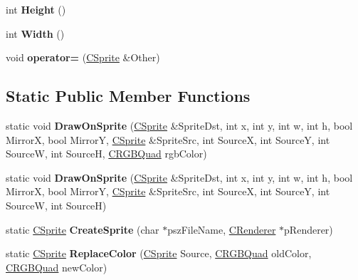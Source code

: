 \begin{DoxyCompactItemize}
\item 
int {\bfseries Height} ()\hypertarget{class_c_sprite_a90ef6f07dd9cace5c8ad5e9581aba2ac}{}\label{class_c_sprite_a90ef6f07dd9cace5c8ad5e9581aba2ac}

\item 
int {\bfseries Width} ()\hypertarget{class_c_sprite_ac1ccfd1392a07e66673de1e2c35104a0}{}\label{class_c_sprite_ac1ccfd1392a07e66673de1e2c35104a0}

\item 
void {\bfseries operator=} (\hyperlink{class_c_sprite}{C\+Sprite} \&Other)\hypertarget{class_c_sprite_a21407e6a129b42655692559fb197ec94}{}\label{class_c_sprite_a21407e6a129b42655692559fb197ec94}

\end{DoxyCompactItemize}
\subsection*{Static Public Member Functions}
\begin{DoxyCompactItemize}
\item 
static void {\bfseries Draw\+On\+Sprite} (\hyperlink{class_c_sprite}{C\+Sprite} \&Sprite\+Dst, int x, int y, int w, int h, bool MirrorX, bool MirrorY, \hyperlink{class_c_sprite}{C\+Sprite} \&Sprite\+Src, int SourceX, int SourceY, int SourceW, int SourceH, \hyperlink{struct_c_r_g_b_quad}{C\+R\+G\+B\+Quad} rgb\+Color)\hypertarget{class_c_sprite_a93dc7c6ee5c8910e34d99bd44c1454c7}{}\label{class_c_sprite_a93dc7c6ee5c8910e34d99bd44c1454c7}

\item 
static void {\bfseries Draw\+On\+Sprite} (\hyperlink{class_c_sprite}{C\+Sprite} \&Sprite\+Dst, int x, int y, int w, int h, bool MirrorX, bool MirrorY, \hyperlink{class_c_sprite}{C\+Sprite} \&Sprite\+Src, int SourceX, int SourceY, int SourceW, int SourceH)\hypertarget{class_c_sprite_a19565c7fe7ed82fdb3e80477e2694a23}{}\label{class_c_sprite_a19565c7fe7ed82fdb3e80477e2694a23}

\item 
static \hyperlink{class_c_sprite}{C\+Sprite} {\bfseries Create\+Sprite} (char $\ast$psz\+File\+Name, \hyperlink{class_c_renderer}{C\+Renderer} $\ast$p\+Renderer)\hypertarget{class_c_sprite_a6fee2249b5b4d5632ea339ce45a2d427}{}\label{class_c_sprite_a6fee2249b5b4d5632ea339ce45a2d427}

\item 
static \hyperlink{class_c_sprite}{C\+Sprite} {\bfseries Replace\+Color} (\hyperlink{class_c_sprite}{C\+Sprite} Source, \hyperlink{struct_c_r_g_b_quad}{C\+R\+G\+B\+Quad} old\+Color, \hyperlink{struct_c_r_g_b_quad}{C\+R\+G\+B\+Quad} new\+Color)\hypertarget{class_c_sprite_ab4c05e3ebbbe12444170e721f386165c}{}\label{class_c_sprite_ab4c05e3ebbbe12444170e721f386165c}

\end{DoxyCompactItemize}
